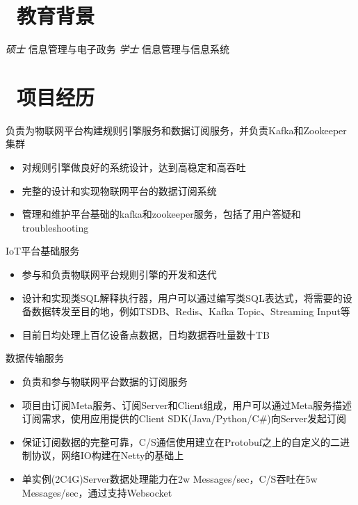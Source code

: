 \documentclass{resume}
\begin{document}


 
\section{\faGraduationCap\  教育背景}
\textit{硕士} 信息管理与电子政务
\textit{学士} 信息管理与信息系统

\section{\faUsers\ 项目经历}

负责为物联网平台构建规则引擎服务和数据订阅服务，并负责Kafka和Zookeeper集群
\begin{itemize}
  \item 对规则引擎做良好的系统设计，达到高稳定和高吞吐
  \item 完整的设计和实现物联网平台的数据订阅系统
  \item 管理和维护平台基础的kafka和zookeeper服务，包括了用户答疑和troubleshooting
\end{itemize}

IoT平台基础服务
\begin{itemize}
  \item 参与和负责物联网平台规则引擎的开发和迭代
  \item 设计和实现类SQL解释执行器，用户可以通过编写类SQL表达式，将需要的设备数据转发至目的地，例如TSDB、Redis、Kafka Topic、Streaming Input等
  \item 目前日均处理上百亿设备点数据，日均数据吞吐量数十TB
\end{itemize}

数据传输服务
\begin{itemize}
  \item 负责和参与物联网平台数据的订阅服务
  \item 项目由订阅Meta服务、订阅Server和Client组成，用户可以通过Meta服务描述订阅需求，使用应用提供的Client SDK(Java/Python/C#)向Server发起订阅
  \item 保证订阅数据的完整可靠，C/S通信使用建立在Protobuf之上的自定义的二进制协议，网络IO构建在Netty的基础上
  \item 单实例(2C4G)Server数据处理能力在2w Messages/sec，C/S吞吐在5w Messages/sec，通过支持Websocket
\end{itemize}
\end{document}
